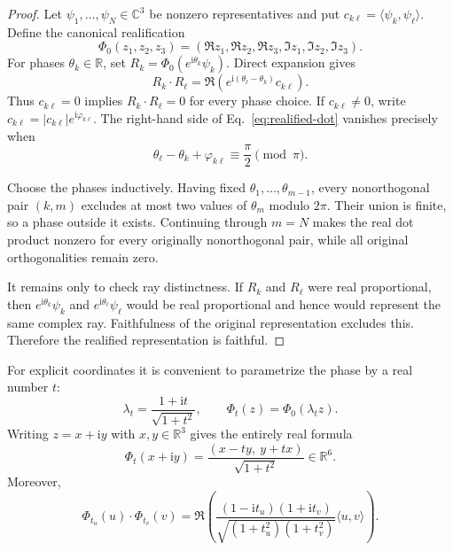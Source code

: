 \documentclass[twocolumn,aps,pra,floatfix,amsmath,amssymb,longbibliography]{revtex4-2}
\theoremstyle{definition}
\theoremstyle{remark}
\newcommand{\ii}{\mathrm{i}}
\newcommand{\C}{\mathbb C}
\newcommand{\R}{\mathbb R}
\begin{document}
\begin{proof}
Let $\psi_1,\ldots,\psi_N\in\C^3$ be nonzero representatives and put
$c_{k\ell}=\langle\psi_k,\psi_\ell\rangle$.  Define the canonical
realification
\begin{equation}
 \Phi_0(z_1,z_2,z_3)
 = (\Re z_1,\Re z_2,\Re z_3,\Im z_1,\Im z_2,\Im z_3).
 \label{eq:canonical-realification}
\end{equation}
For phases $\theta_k\in\R$, set
$R_k=\Phi_0(e^{\ii\theta_k}\psi_k)$.  Direct expansion gives
\begin{equation}
 R_k\mathbin{\cdot}R_\ell
 =\Re\!\left(e^{\ii(\theta_\ell-\theta_k)}c_{k\ell}\right).
 \label{eq:realified-dot}
\end{equation}
Thus $c_{k\ell}=0$ implies $R_k\cdot R_\ell=0$ for every phase choice.
If $c_{k\ell}\ne0$, write
$c_{k\ell}=|c_{k\ell}|e^{\ii\varphi_{k\ell}}$.  The right-hand side of
Eq.~\eqref{eq:realified-dot} vanishes precisely when
\begin{equation}
 \theta_\ell-\theta_k+\varphi_{k\ell}
 \equiv\frac{\pi}{2}\pmod\pi.
 \label{eq:forbidden-phase}
\end{equation}

Choose the phases inductively.  Having fixed
$\theta_1,\ldots,\theta_{m-1}$, every nonorthogonal pair $(k,m)$ excludes at
most two values of $\theta_m$ modulo $2\pi$.  Their union is finite, so a
phase outside it exists.  Continuing through $m=N$ makes the real dot product
nonzero for every originally nonorthogonal pair, while all original
orthogonalities remain zero.

It remains only to check ray distinctness.  If $R_k$ and $R_\ell$ were real
proportional, then $e^{\ii\theta_k}\psi_k$ and
$e^{\ii\theta_\ell}\psi_\ell$ would be real proportional and hence would
represent the same complex ray.  Faithfulness of the original representation
excludes this.  Therefore the realified representation is faithful.
\end{proof}

For explicit coordinates it is convenient to parametrize the phase by a real
number $t$:
\begin{equation}
 \lambda_t=\frac{1+\ii t}{\sqrt{1+t^2}},\qquad
 \Phi_t(z)=\Phi_0(\lambda_tz).
 \label{eq:lambda-t}
\end{equation}
Writing $z=x+\ii y$ with $x,y\in\R^3$ gives the entirely real formula
\begin{equation}
 \Phi_t(x+\ii y)=\frac{(x-ty,\ y+tx)}{\sqrt{1+t^2}}\in\R^6.
 \label{eq:explicit-realification}
\end{equation}
Moreover,
\begin{equation}
 \Phi_{t_u}(u)\mathbin{\cdot}\Phi_{t_v}(v)
 =\Re\!\left(
 \frac{(1-\ii t_u)(1+\ii t_v)}
 {\sqrt{(1+t_u^2)(1+t_v^2)}}\langle u,v\rangle
 \right).
 \label{eq:t-dot}
\end{equation}
\end{document}
